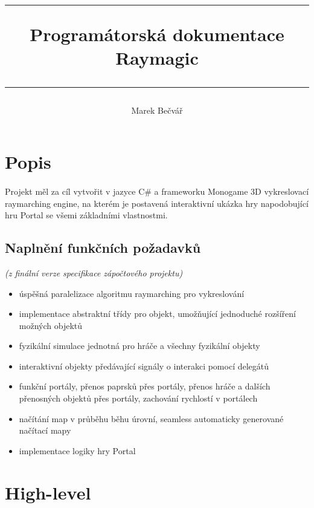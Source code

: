 \documentclass[a4paper, 12pt]{article}
\title{
        \vspace{1in}
        \rule{\linewidth}{0.5pt}
		\usefont{OT1}{bch}{b}{n}
        \huge Programátorská dokumentace \\Raymagic\\
        \vspace{-10pt}
        \rule{\linewidth}{1pt}
}
\author{
		\normalfont\normalsize
        Marek Bečvář\\[-3pt]\normalsize
}
\date{}
\begin{document}
\maketitle 
\newpage

\tableofcontents
\newpage

\section{Popis} 
\paragraph{} 
Projekt měl za cíl vytvořit v jazyce C\# a frameworku Monogame 3D vykreslovací
raymarching engine, na kterém je postavená interaktivní ukázka hry napodobující 
hru Portal se všemi základními vlastnostmi.

\subsection{Naplnění funkčních požadavků}
\emph{(z finální verze specifikace zápočtového projektu)}

\vspace{-5px}
\begin{itemize}
    \item úspěšná paralelizace algoritmu raymarching pro vykreslování
    \item implementace abstraktní třídy pro objekt, umožňující jednoduché
        rozšíření možných objektů
    \item fyzikální simulace jednotná pro hráče a všechny fyzikální objekty
    \item interaktivní objekty předávající signály o interakci pomocí delegátů
    \item funkční portály, přenos paprsků přes portály, přenos hráče a dalších
        přenosných objektů přes portály, zachování rychlostí v portálech
    \item načítání map v průběhu běhu úrovní, seamless automaticky generované
        načítací mapy
    \item implementace logiky hry Portal
\end{itemize}

\section{High-level}
\end{document}
